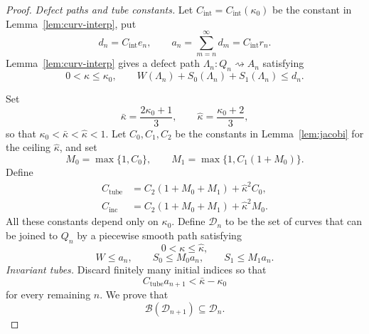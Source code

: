 \documentclass[11pt]{article}
\theoremstyle{remark}
\newcommand{\Bmap}{\mathcal B}
\begin{document}
\begin{proof}
\emph{Defect paths and tube constants.}
Let \(C_{\mathrm{int}}=C_{\mathrm{int}}(\kappa_0)\) be the constant in
Lemma~\ref{lem:curv-interp}, put
\[
   d_n=C_{\mathrm{int}}e_n,
   \qquad
   a_n=\sum_{m=n}^\infty d_m=C_{\mathrm{int}}r_n.
\]
Lemma~\ref{lem:curv-interp} gives a defect path
\(\Lambda_n:Q_n\rightsquigarrow A_n\) satisfying
\[
   0<\kappa\leq\kappa_0,
   \qquad
   W(\Lambda_n)+S_0(\Lambda_n)+S_1(\Lambda_n)\leq d_n.
\]

Set
\[
   \bar\kappa=\frac{2\kappa_0+1}{3},
   \qquad
   \widehat\kappa=\frac{\kappa_0+2}{3},
\]
so that \(\kappa_0<\bar\kappa<\widehat\kappa<1\).  Let
\(C_0,C_1,C_2\) be the constants in Lemma~\ref{lem:jacobi} for the ceiling
\(\widehat\kappa\), and set
\begin{equation}\label{eq:tube-constants}
 M_0=\max\{1,C_0\},
 \qquad
 M_1=\max\{1,C_1(1+M_0)\}.
\end{equation}
Define
\begin{equation}\label{eq:tube-curvature-constants}
\begin{aligned}
 C_{\mathrm{tube}}
    &=C_2(1+M_0+M_1)+\widehat\kappa^2C_0,\\
 C_{\mathrm{inc}}
    &=C_2(1+M_0+M_1)+\widehat\kappa^2M_0.
\end{aligned}
\end{equation}
All these constants depend only on \(\kappa_0\).  Define \(\mathcal D_n\) to
be the set of curves that can be joined to \(Q_n\) by a piecewise smooth path
satisfying
\[
   0<\kappa\leq\widehat\kappa,
\]
\[
   W\leq a_n,
   \qquad
   S_0\leq M_0a_n,
   \qquad
   S_1\leq M_1a_n.
\]
\emph{Invariant tubes.}
Discard finitely many initial indices so that
\begin{equation}\label{eq:tube-smallness}
   C_{\mathrm{tube}}a_{n+1}<\bar\kappa-\kappa_0
\end{equation}
for every remaining \(n\).  We prove that
\begin{equation}\label{eq:tube-invariance}
   \Bmap(\mathcal D_{n+1})\subseteq\mathcal D_n.
\end{equation}


\end{proof}
\end{document}
